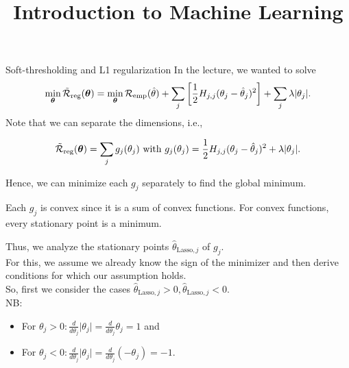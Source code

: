 \documentclass[11pt,compress,t,notes=noshow, xcolor=table]{beamer}
\title{Introduction to Machine Learning}
\date{}
\begin{document}



\begin{vbframe}{Soft-thresholding and L1 regularization}
In the lecture, we wanted to solve
     \[
      \min_{\bm{\theta}} \mathcal{\tilde R}_{\text{reg}}(\bm{\theta}) =  \min_{\bm{\theta}}\mathcal{R}_{\text{emp}}(\hat{\theta}) + \sum_j \left[ \frac{1}{2} H_{j,j} (\theta_j - \hat{\theta}_j)^2 \right] + \sum_j \lambda |\theta_j|.
      \]
Note that we can separate the dimensions, i.e.,

\[\mathcal{\tilde R}_{\text{reg}}(\bm{\theta}) = \sum_j g_j(\theta_j) \text{ with } g_j(\theta_j) = \frac{1}{2} H_{j,j} (\theta_j - \hat{\theta}_j)^2 + \lambda |\theta_j|.\]
      
Hence, we can minimize each $g_j$ separately to find the global minimum. \\
\lz

Each $g_j$ is convex since it is a sum of convex functions. For convex functions, every stationary point is a minimum. \\
\lz



\framebreak

Thus, we analyze the stationary points $\hat{\theta}_{\text{Lasso},j}$ of $g_j.$ \\
\lz 
For this, we assume we already know the sign of the minimizer and then derive conditions for which our assumption holds. \\
\lz 
So, first we consider the cases $\hat{\theta}_{\text{Lasso},j} > 0, \hat{\theta}_{\text{Lasso},j} < 0.$\\
\lz
NB: 
\begin{itemize}
    \item For $\theta_j > 0: \frac{d}{d\theta_j}\vert \theta_j\vert = \frac{d}{d\theta_j}\theta_j = 1$ and 
    \item For $\theta_j < 0: \frac{d}{d\theta_j}\vert \theta_j\vert = \frac{d}{d\theta_j}\left(-\theta_j\right) = -1$.
\end{itemize}

\framebreak


\end{vbframe}
\end{document}
